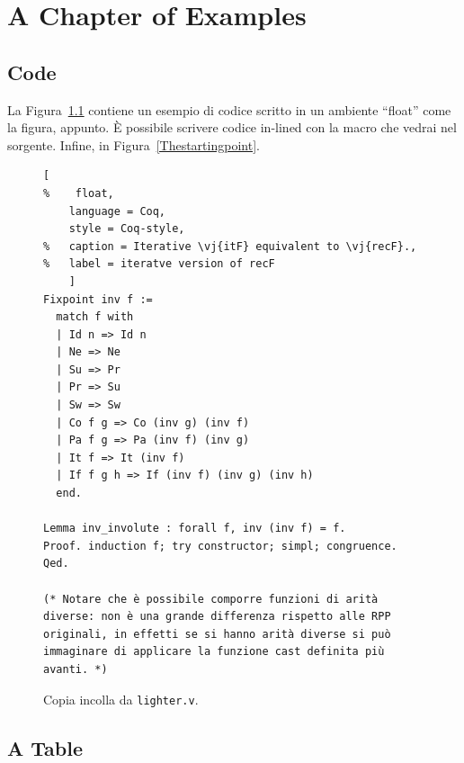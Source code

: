 \chapter{A Chapter of Examples}
\label{chapter1}

\section{Code}
La Figura~\ref{iteratve version of recF} contiene un esempio di codice scritto in un ambiente ``float'' come la figura, appunto.
È possibile scrivere codice in-lined  con la macro che vedrai nel sorgente.
Infine, in Figura~\ref{Thestartingpoint}.

\begin{figure}
\begin{lstlisting}[
%    float,
	language = Coq,
	style = Coq-style,
%	caption = Iterative \vj{itF} equivalent to \vj{recF}.,
%	label = iteratve version of recF
	]
Fixpoint inv f :=
  match f with
  | Id n => Id n
  | Ne => Ne
  | Su => Pr
  | Pr => Su
  | Sw => Sw
  | Co f g => Co (inv g) (inv f)
  | Pa f g => Pa (inv f) (inv g)
  | It f => It (inv f)
  | If f g h => If (inv f) (inv g) (inv h)
  end.

Lemma inv_involute : forall f, inv (inv f) = f.
Proof. induction f; try constructor; simpl; congruence. Qed.

(* Notare che è possibile comporre funzioni di arità diverse: non è una grande differenza rispetto alle RPP originali, in effetti se si hanno arità diverse si può immaginare di applicare la funzione cast definita più avanti. *)
\end{lstlisting}
\caption{Copia incolla da \texttt{lighter.v}.}
\label{iteratve version of recF}
\end{figure}







\section{A Table}

